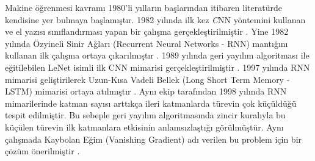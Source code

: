 Makine öğrenmesi kavramı 1980'li yılların başlarından itibaren literatürde kendisine yer bulmaya başlamıştır. 1982 yılında ilk kez \textit CNN yöntemini kullanan ve el yazısı sınıflandırması yapan bir çalışma gerçekleştirilmiştir \cite{fukushima1982neocognitron}. Yine 1982 yılında Özyineli Sinir Ağları (Recurrent Neural Networks - RNN) mantığını kullanan ilk çalışma ortaya çıkarılmıştır \cite{hopfield1982neural}. 1989 yılında geri yayılım algoritması ile eğitilebilen LeNet isimli ilk CNN mimarisi gerçekleştirilmiştir \cite{lecun1989backpropagation}. 1997 yılında RNN mimarisi geliştirilerek Uzun-Kısa Vadeli Bellek (Long Short Term Memory - LSTM) mimarisi ortaya atılmıştır \cite{hochreiter1997long}. Aynı ekip tarafından 1998 yılında RNN mimarilerinde katman sayısı arttıkça ileri katmanlarda türevin çok küçüldüğü tespit edilmiştir. Bu sebeple geri yayılım algoritmasında zincir kuralıyla bu küçülen türevin ilk katmanlara etkisinin anlamsızlaştığı görülmüştür. Aynı çalışmada Kaybolan Eğim (Vanishing Gradient) adı verilen bu problem için bir çözüm önerilmiştir \cite{hochreiter1998vanishing}.

